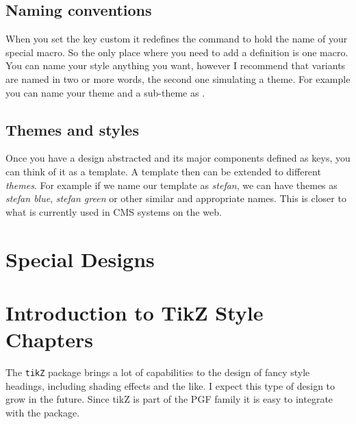 \section{Naming conventions}

When you set the key custom it redefines the command  to hold the name of your special macro.  So the only place where you need to add a definition is one macro. You can name your style anything you want, however I recommend that variants are named in two or more words, the second one simulating a theme. For example you can name your theme  and a sub-theme as  .


\section{Themes and styles}

Once you have a design abstracted and its major components defined as keys, you can think of it as a template. A template then can be extended to different \textit{themes}. For example if we name our template as \textit{stefan}, we can have themes as \textit{stefan blue}, \textit{stefan green} or other similar and appropriate names. This is closer to what is currently used in CMS systems on the web.






\chapter{Special Designs}

\lipsum[1-3]








\chapter{Introduction to TikZ Style Chapters}

The \lstinline{tikZ} package brings a lot of capabilities to the design of fancy style headings, including shading effects and the like. I expect this type of design to grow in the future. Since tikZ is part of the PGF family it is easy to integrate with the package.

